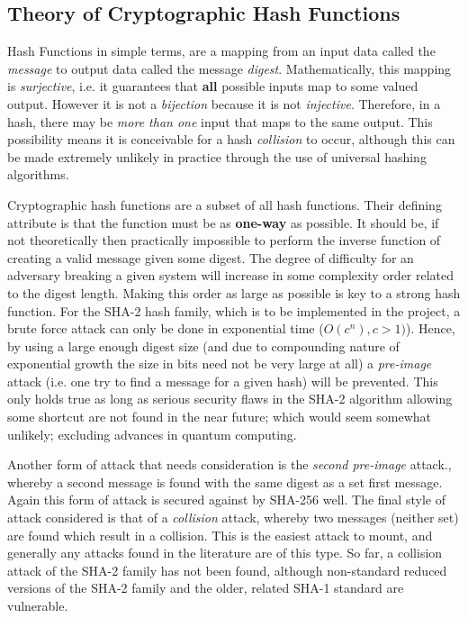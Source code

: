 \subsection{Theory of Cryptographic Hash Functions}

Hash Functions in simple terms, are a mapping from an input data called the
\emph{message} to output data called the message \emph{digest}.
Mathematically, this mapping is \emph{surjective}, i.e. it guarantees
that \textbf{all} possible inputs map to some valued output.
However it is not a \emph{bijection} because it is not \emph{injective}.
Therefore, in a hash, there may be \emph{more than one} input that maps to
the same output.
This possibility means it is conceivable for a hash \emph{collision} to occur,
although this can be made extremely unlikely in practice through the use of
universal hashing algorithms.

Cryptographic hash functions are a subset of all hash functions.
Their defining attribute is that the function must be as \textbf{one-way} as
possible.
It should be, if not theoretically then practically impossible to perform the
inverse function of creating a valid message given some digest.
The degree of difficulty for an adversary breaking a given system will increase
in some complexity order related to the digest length.
Making this order as large as possible is key to a strong hash function.
For the SHA-2 hash family, which is to be implemented in the project, a brute force
attack can only be done in exponential time ($O(c^{n}), c > 1)$).
Hence, by using a large enough digest size (and due to compounding nature of
exponential growth the size in bits need not be very large at all) a
\emph{pre-image} attack (i.e. one try to find a message for a given hash)
will be prevented.
This only holds true as long as serious security flaws in the SHA-2 algorithm
allowing some shortcut are not found in the near future; which would seem
somewhat unlikely; excluding advances in quantum computing.

Another form of attack that needs consideration is the
\emph{second pre-image} attack.,
whereby a second message is found with the same digest as a set first message.
Again this form of attack is secured against by SHA-256 well.
The final style of attack considered is that of a \emph{collision} attack,
whereby two messages (neither set) are found which result in a collision.
This is the easiest attack to mount, and generally any attacks found in the
literature are of this type. So far, a collision attack of the SHA-2
family has not been found, although non-standard reduced versions of the
SHA-2 family and the older, related SHA-1 standard are
vulnerable\cite{sanadhya2009combinatorial}.

